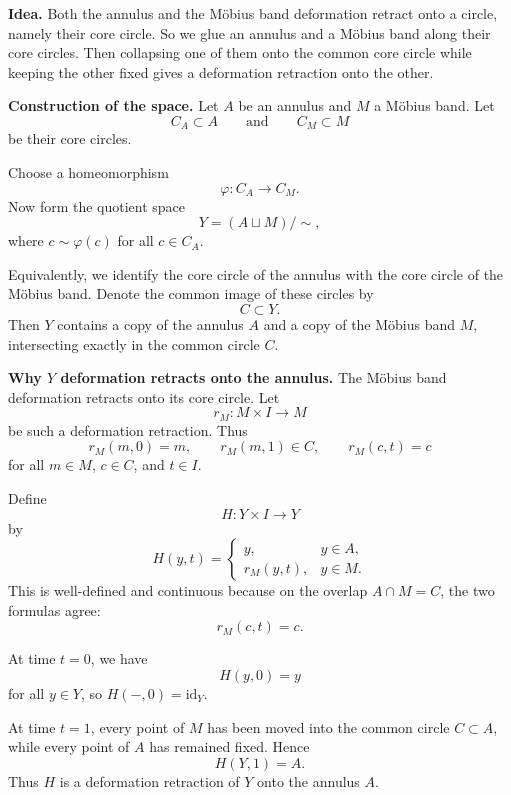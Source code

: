 \begin{solution}

\par

\textbf{Idea.}
Both the annulus and the Möbius band deformation retract onto a circle, namely their core circle. So we glue an annulus and a Möbius band along their core circles. Then collapsing one of them onto the common core circle while keeping the other fixed gives a deformation retraction onto the other.

\par

\textbf{Construction of the space.}
Let \(A\) be an annulus and \(M\) a Möbius band. Let
\[
C_A\subset A
\qquad\text{and}\qquad
C_M\subset M
\]
be their core circles.

Choose a homeomorphism
\[
\varphi:C_A\to C_M.
\]
Now form the quotient space
\[
Y=(A\sqcup M)/\sim,
\]
where \(c\sim \varphi(c)\) for all \(c\in C_A\).

Equivalently, we identify the core circle of the annulus with the core circle of the Möbius band. Denote the common image of these circles by
\[
C\subset Y.
\]
Then \(Y\) contains a copy of the annulus \(A\) and a copy of the Möbius band \(M\), intersecting exactly in the common circle \(C\).

\par

\textbf{Why \(Y\) deformation retracts onto the annulus.}
The Möbius band deformation retracts onto its core circle. Let
\[
r_M:M\times I\to M
\]
be such a deformation retraction. Thus
\[
r_M(m,0)=m,
\qquad
r_M(m,1)\in C,
\qquad
r_M(c,t)=c
\]
for all \(m\in M\), \(c\in C\), and \(t\in I\).

Define
\[
H:Y\times I\to Y
\]
by
\[
H(y,t)=
\begin{cases}
	y,& y\in A,\\[4pt]
	r_M(y,t),& y\in M.
\end{cases}
\]
This is well-defined and continuous because on the overlap \(A\cap M=C\), the two formulas agree:
\[
r_M(c,t)=c.
\]

At time \(t=0\), we have
\[
H(y,0)=y
\]
for all \(y\in Y\), so \(H(-,0)=\mathrm{id}_Y\).

At time \(t=1\), every point of \(M\) has been moved into the common circle \(C\subset A\), while every point of \(A\) has remained fixed. Hence
\[
H(Y,1)=A.
\]
Thus \(H\) is a deformation retraction of \(Y\) onto the annulus \(A\).

\par


\end{solution}
